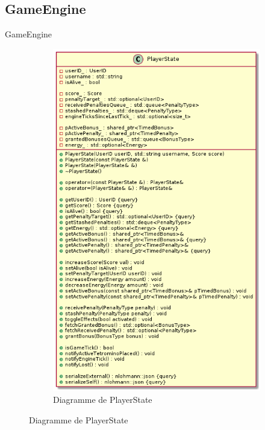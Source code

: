 \documentclass{beamer}
\begin{document}
\subsection{GameEngine}
\begin{frame}{GameEngine}

\begin{figure}

\centering
\hfill
\begin{subfigure}{0.3\textwidth}
    \includegraphics[width=\textwidth]{../../res/uml/class/PlayerStateClass.png}
    \caption{Diagramme de PlayerState}
    \label{fig:second}
\end{subfigure}

\end{figure}
\end{frame}
\end{document}
